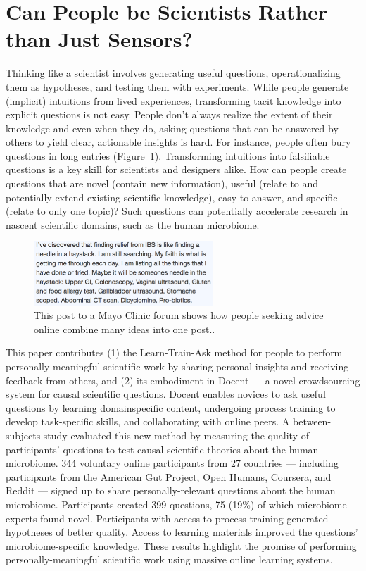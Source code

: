 \section{Can People be Scientists Rather than Just Sensors?}
Thinking like a scientist involves generating useful questions,
operationalizing them as hypotheses, and testing them
with experiments. While people generate (implicit) intuitions
from lived experiences, transforming tacit knowledge into
explicit questions is not easy. People don’t always realize the
extent of their knowledge and even when they do, asking questions 
that can be answered by others to yield clear, actionable
insights is hard. For instance, people often bury
questions in long entries (Figure~\ref{fig:docent-1}). Transforming intuitions
into falsifiable questions is a key skill for scientists and designers
alike. How can people create questions that are novel
(contain new information), useful (relate to and potentially
extend existing scientific knowledge), easy to answer, and
specific (relate to only one topic)? Such questions can
potentially accelerate research in nascent scientific domains,
such as the human microbiome.

\begin{figure}[h]
  \centering
  \includegraphics[width=0.6\textwidth]{figures/docent/fig-1.png}
  \caption[Post to a Mayo Clinic forum]
{This post to a Mayo Clinic forum shows how people
seeking advice online combine many ideas into one post..}
  \label{fig:docent-1}
\end{figure}

This paper contributes (1) the Learn-Train-Ask method for
people to perform personally meaningful scientific work by
sharing personal insights and receiving feedback from
others, and (2) its embodiment in Docent — a novel
crowdsourcing system for causal scientific questions. Docent
enables novices to ask useful questions by learning domainspecific
content, undergoing process training to develop
task-specific skills, and collaborating with online peers. A
between-subjects study evaluated this new method by measuring
the quality of participants’ questions to test causal scientific
theories about the human microbiome. 344 voluntary
online participants from 27 countries — including participants
from the American Gut Project, Open Humans,
Coursera, and Reddit — signed up to share personally-relevant
questions about the human microbiome. Participants
created 399 questions, 75 (19\%) of which microbiome experts
found novel. Participants with access to process training
generated hypotheses of better quality. Access to
learning materials improved the questions’ microbiome-specific
knowledge. These results highlight the promise of performing
personally-meaningful scientific work using
massive online learning systems.

